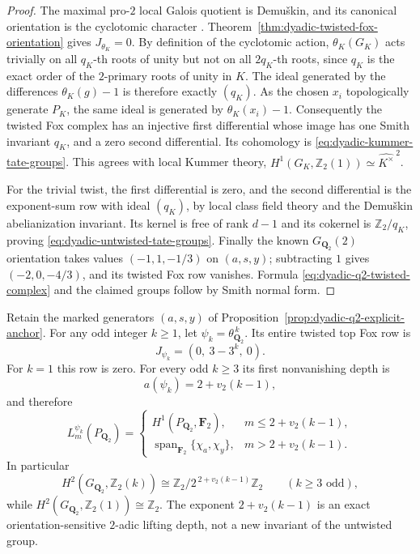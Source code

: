 \begin{proof}
The maximal pro-$2$ local Galois quotient
is Demu\v{s}kin, and its canonical orientation
is the cyclotomic character
\cite{LabuteClassification,NSW}.
Theorem~\ref{thm:dyadic-twisted-fox-orientation}
gives $J_{\theta_K}=0$.
By definition of the cyclotomic action,
$\theta_K(G_K)$ acts trivially on all $q_K$-th
roots of unity but not on all $2q_K$-th
roots, since $q_K$ is the exact order
of the $2$-primary roots of unity in $K$.
The ideal generated by the differences
$\theta_K(g)-1$ is therefore exactly $(q_K)$.
As the chosen $x_i$ topologically generate
$P_K$, the same ideal is generated by
$\theta_K(x_i)-1$.
Consequently the twisted Fox complex has
an injective first differential whose image
has one Smith invariant $q_K$, and a zero
second differential.  Its cohomology is
\eqref{eq:dyadic-kummer-tate-groups}.
This agrees with local Kummer theory,
$H^1(G_K,\mathbb Z_2(1))
\simeq\widehat{K^\times}^{\,2}$.

For the trivial twist, the first differential
is zero, and the second differential is
the exponent-sum row with ideal $(q_K)$,
by local class field theory and the
Demu\v{s}kin abelianization invariant.
Its kernel is free of rank $d-1$ and its
cokernel is $\mathbb Z_2/q_K$, proving
\eqref{eq:dyadic-untwisted-tate-groups}.
Finally the known $G_{\mathbf Q_2}(2)$
orientation takes values $(-1,1,-1/3)$
on $(a,s,y)$; subtracting $1$ gives
$(-2,0,-4/3)$, and its twisted Fox row
vanishes.  Formula
\eqref{eq:dyadic-q2-twisted-complex}
and the claimed groups follow by Smith
normal form.
\end{proof}

\begin{corollary}
\label{cor:dyadic-q2-cyclotomic-power-depth}
Retain the marked generators $(a,s,y)$ of
Proposition~\ref{prop:dyadic-q2-explicit-anchor}.
For any odd integer $k\ge1$, let
$\psi_k=\theta_{\mathbf Q_2}^{\,k}$.  Its entire
twisted top Fox row is
\begin{equation}\label{eq:dyadic-q2-cyclotomic-power-row}
J_{\psi_k}=(0,\ 3-3^k,\ 0).
\end{equation}
For $k=1$ this row is zero.  For every odd
$k\ge3$ its first nonvanishing depth is
\[
a(\psi_k)=2+v_2(k-1),
\]
and therefore
\begin{equation}\label{eq:dyadic-q2-cyclotomic-power-lifting}
L_m^{\psi_k}(P_{\mathbf Q_2})=
\begin{cases}
H^1(P_{\mathbf Q_2},\mathbf F_2),
 &m\le 2+v_2(k-1),\\
\operatorname{span}_{\mathbf F_2}
   \{\chi_a,\chi_y\},
 &m>2+v_2(k-1).
\end{cases}
\end{equation}
In particular
\[
H^2(G_{\mathbf Q_2},\mathbb Z_2(k))
\cong \mathbb Z_2/2^{\,2+v_2(k-1)}\mathbb Z_2
\qquad(k\ge3\text{ odd}),
\]
while $H^2(G_{\mathbf Q_2},\mathbb Z_2(1))
\cong\mathbb Z_2$.
The exponent $2+v_2(k-1)$ is an exact
orientation-sensitive $2$-adic lifting depth,
not a new invariant of the untwisted group.
\end{corollary}

